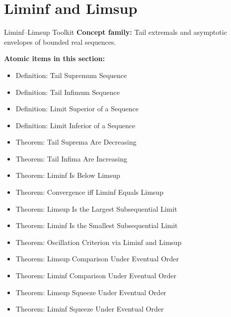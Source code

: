 \section{Liminf and Limsup}

\begin{toolkitbox}{Liminf--Limsup Toolkit}
\textbf{Concept family:} Tail extremals and asymptotic envelopes of bounded
real sequences.

\medskip
\textbf{Atomic items in this section:}
\begin{itemize}
  \item Definition: Tail Supremum Sequence
  \item Definition: Tail Infimum Sequence
  \item Definition: Limit Superior of a Sequence
  \item Definition: Limit Inferior of a Sequence
  \item Theorem: Tail Suprema Are Decreasing
  \item Theorem: Tail Infima Are Increasing
  \item Theorem: Liminf Is Below Limsup
  \item Theorem: Convergence iff Liminf Equals Limsup
  \item Theorem: Limsup Is the Largest Subsequential Limit
  \item Theorem: Liminf Is the Smallest Subsequential Limit
  \item Theorem: Oscillation Criterion via Liminf and Limsup
  \item Theorem: Limsup Comparison Under Eventual Order
  \item Theorem: Liminf Comparison Under Eventual Order
  \item Theorem: Limsup Squeeze Under Eventual Order
  \item Theorem: Liminf Squeeze Under Eventual Order
\end{itemize}
\end{toolkitbox}


